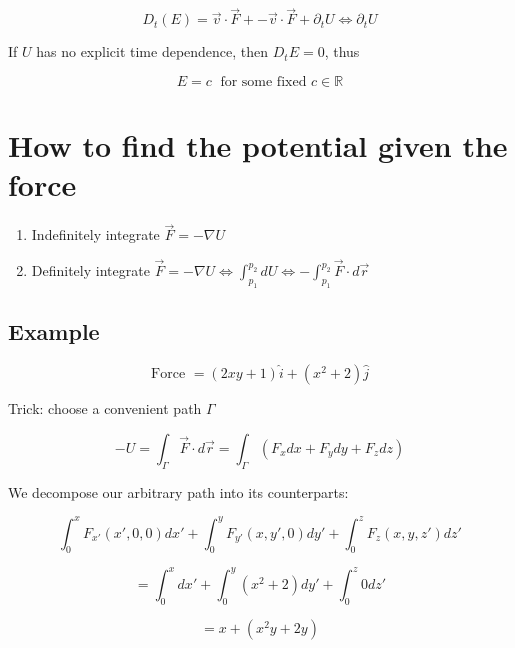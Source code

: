 \documentclass{article}
\newtheorem{one minute paper}[theorem]{One Minute Paper}
\begin{document}
\begin{equation}
    D_t(E) = \vec{v} \cdot \vec{F} + -\vec{v} \cdot \vec{F} + \partial_t U \iff \partial_t U
\end{equation}

If $U$ has no explicit time dependence, then $D_t E = 0$, thus 

\begin{equation}
    E = c \; \text{ for some fixed } c \in \mathbb{R}
\end{equation}

\section*{How to find the potential given the force}

\begin{enumerate}
    \item Indefinitely integrate $\vec{F} = -\nabla U$
    \item Definitely integrate $\vec{F} = -\nabla U \iff \int_{p_1}^{p_2}dU \iff -\int_{p_1}^{p_2}\vec{F} \cdot d\vec{r}$
\end{enumerate}

\subsection*{Example}

\begin{equation}
    \text{Force } = (2xy + 1)\hat{i} + (x^2+2)\hat{j}
\end{equation}

Trick: choose a convenient path $\Gamma$

\begin{equation}
    -U = \int_{\Gamma} \vec{F} \cdot d\vec{r} = \int_{\Gamma} (F_xdx + F_ydy + F_zdz)
\end{equation}

We decompose our arbitrary path into its counterparts:

\begin{equation}
    \int_{0}^{x} F_{x'}(x',0,0)dx' + \int_{0}^{y}F_{y'}(x,y',0)dy' + \int_{0}^{z}F_z(x,y,z')dz'
\end{equation}

\begin{equation}
    = \int_{0}^{x}dx' + \int_{0}^{y}(x^2 + 2)dy' + \int_{0}^{z}0 dz'
\end{equation}

\begin{equation}
    = x + (x^2y+2y)
\end{equation}
\end{document}
